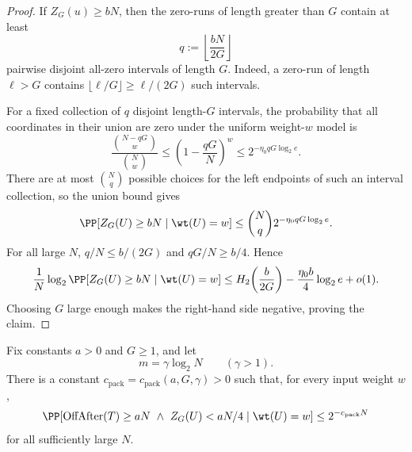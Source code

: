 \begin{proof}
If \(Z_G(u)\ge bN\), then the zero-runs of length greater than \(G\) contain at least
\[
q:=\left\lfloor \frac{bN}{2G}\right\rfloor
\]
pairwise disjoint all-zero intervals of length \(G\). Indeed, a zero-run of length \(\ell>G\) contains
\(\lfloor \ell/G\rfloor\ge \ell/(2G)\) such intervals.

For a fixed collection of \(q\) disjoint length-\(G\) intervals, the probability that all coordinates in their union
are zero under the uniform weight-\(w\) model is
\[
\frac{\binom{N-qG}{w}}{\binom{N}{w}}
\le
\left(1-\frac{qG}{N}\right)^w
\le
2^{-\eta_0 qG\log_2 e}.
\]
There are at most \(\binom{N}{q}\) possible choices for the left endpoints of such an interval collection, so the union
bound gives
\[
\PP[Z_G(U)\ge bN\mid \wt(U)=w]
\le
\binom{N}{q}2^{-\eta_0 qG\log_2 e}.
\]
For all large \(N\), \(q/N\le b/(2G)\) and \(qG/N\ge b/4\). Hence
\[
\frac1N\log_2 \PP[Z_G(U)\ge bN\mid \wt(U)=w]
\le
H_2\!\left(\frac{b}{2G}\right)-\frac{\eta_0 b}{4}\log_2 e+o(1).
\]
Choosing \(G\) large enough makes the right-hand side negative, proving the claim.
\end{proof}

\begin{lemma}
\label{lem:dense-short-gap-witness-packing}
Fix constants \(a>0\) and \(G\ge 1\), and let
\[
m=\gamma\log_2 N
\qquad(\gamma>1).
\]
There is a constant \(c_{\mathrm{pack}}=c_{\mathrm{pack}}(a,G,\gamma)>0\) such that, for every input weight \(w\),
\[
\PP[\mathrm{OffAfter}(T)\ge aN\ \wedge\ Z_G(U)<aN/4\mid \wt(U)=w]
\le
2^{-c_{\mathrm{pack}}N}
\]
for all sufficiently large \(N\).
\end{lemma}


